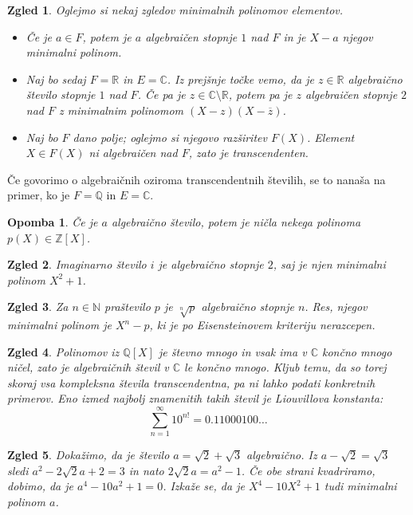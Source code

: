 \documentclass[10pt, a4paper]{article}
\newtheorem*{opomba}{Opomba}
\newtheorem{zgled}{Zgled}[section]
\newcommand{\N}{\mathbb {N}}
\newcommand{\Z}{\mathbb {Z}}
\newcommand{\Q}{\mathbb {Q}}
\newcommand{\R}{\mathbb {R}}
\newcommand{\C}{\mathbb {C}}
\begin{document}
\begin{zgled}
  Oglejmo si nekaj zgledov minimalnih polinomov elementov.
  \begin{itemize}
    \item Če je $a \in F$, potem je $a$ algebraičen stopnje $1$ nad $F$ in je $X - a$ njegov minimalni polinom.
    \item Naj bo sedaj $F = \R$ in $E = \C$. Iz prejšnje točke vemo, da je $z \in \R$
    algebraično število stopnje $1$ nad $F$. Če pa je $z \in \C \setminus \R$,
    potem pa je $z$ algebraičen stopnje $2$ nad $F$ z minimalnim polinomom $(X - z) (X - \overline{z})$.
    \item Naj bo $F$ dano polje; oglejmo si njegovo razširitev $F(X)$.
    Element $X \in F(X)$ ni algebraičen nad $F$, zato je transcendenten.
  \end{itemize}
\end{zgled}

Če govorimo o algebraičnih oziroma transcendentnih številih, se to nanaša na primer, ko je $F = \Q$
in $E = \C$.

\begin{opomba}
  Če je $a$ algebraično število, potem je ničla nekega polinoma $p(X) \in \Z [X]$.
\end{opomba}

\begin{zgled}
  Imaginarno število $i$ je algebraično stopnje $2$, saj je njen minimalni polinom $X^2 + 1$.
\end{zgled}

\begin{zgled}
  Za $n \in \N$ praštevilo $p$ je $\sqrt[n]{p}$ algebraično stopnje $n$.
  Res, njegov minimalni polinom je $X^n - p$, ki je po Eisensteinovem kriteriju nerazcepen. 
\end{zgled}

\begin{zgled}
  Polinomov iz $\Q [X]$ je števno mnogo in vsak ima v $\C$ končno mnogo ničel,
  zato je algebraičnih števil v $\C$ le končno mnogo. Kljub temu,
  da so torej skoraj vsa kompleksna števila transcendentna, pa ni lahko podati konkretnih primerov.
  Eno izmed najbolj znamenitih takih števil je Liouvillova konstanta:
  $$\sum_{n = 1} ^\infty 10^{n!} = 0.11000100 \dots$$
\end{zgled}

\begin{zgled}
  Dokažimo, da je število $a = \sqrt{2} + \sqrt{3}$ algebraično.
  Iz $a - \sqrt{2} = \sqrt{3}$ sledi $a^2 - 2 \sqrt{2} a + 2 = 3$
  in nato $2 \sqrt{2} a = a^2 - 1$. Če obe strani kvadriramo, dobimo, da je 
  $a^4 - 10 a^2 + 1 = 0$. Izkaže se, da je $X^4 - 10 X^2 + 1$ tudi minimalni polinom $a$.
\end{zgled}
\end{document}

